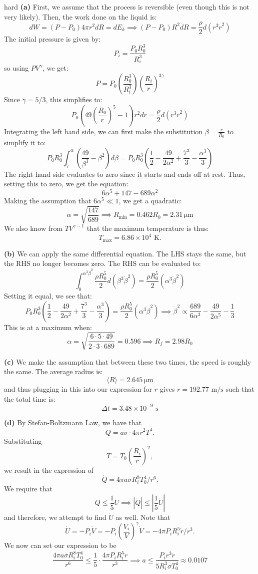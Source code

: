 \begin{solution}{hard}
\textbf{(a)} First, we assume that the process is reversible (even though this is not very likely). Then, the work done on the liquid is:
$$dW=(P-P_0)4\pi r^2 dR = dE_k \implies (P-P_0) R^2 dR = \frac{\rho}{2}d(r^3 \dot{r}^2)$$
The initial pressure is given by:
$$P_i=\frac{P_0R_0^3}{R_i^3}$$
so using $PV^\gamma$, we get:
$$P = P_0 \left(\frac{R_0^3}{R_i^3}\right)\left(\frac{R_i}{r}\right)^{3\gamma}$$
Since $\gamma=5/3$, this simplifies to:
$$P_0\left(49\left(\frac{R_0}{r}\right)^{5}-1\right) r^2 dr = \frac{\rho}{2}d(r^3 \dot{r}^2)$$
Integrating the left hand side, we can first make the substitution $\beta=\frac{r}{R_0}$ to simplify it to:
$$P_0R_0^3 \int_7^\alpha \left(\frac{49}{\beta^3}-\beta^2\right) d\beta = P_0R_0^3 \left(\frac{1}{2}-\frac{49}{2\alpha^2}+\frac{7^3}{3}-\frac{\alpha^3}{3}\right)$$
The right hand side evaluates to zero since it starts and ends off at rest. Thus, setting this to zero, we get the equation:
$$6\alpha^{5}+147-689\alpha^{2}$$
Making the assumption that $6\alpha^5 \ll 1$, we get a quadratic:
$$\alpha=\sqrt{\frac{147}{689}} \implies R_\text{min}=0.462R_0=2.31 \,\mathrm{\mu m}$$
We also know from $TV^{\gamma-1}$ that the maximum temperature is thus:
$$T_\text{max}=6.86 \times 10^4 \text{ K}.$$
\vspace{3mm}

\noindent \textbf{(b)} We can apply the same differential equation. The LHS stays the same, but the RHS no longer becomes zero. The RHS can be evaluated to:
$$\int_{0}^{\alpha^3\dot{\beta}^2} \frac{\rho R_0^5}{2} d(\beta^3\dot{\beta}^2)=\frac{\rho R_0^5}{2}(\alpha^3\dot{\beta}^2)$$
Setting it equal, we see that:
$$P_0R_0^3 \left(\frac{1}{2}-\frac{49}{2\alpha^2}+\frac{7^3}{3}-\frac{\alpha^3}{3}\right)=\frac{\rho R_0^5}{2}(\alpha^3\dot{\beta}^2) \implies \dot{\beta}^2 \propto \frac{689}{6\alpha^3}-\frac{49}{2\alpha^5}-\frac{1}{3}$$
This is at a maximum when:
$$\alpha=\sqrt{\frac{6\cdot5\cdot49}{2\cdot3\cdot689}}=0.596 \implies R_f=2.98 R_0$$
\vspace{3mm}

\noindent \textbf{(c)} We make the assumption that between these two times, the speed is roughly the same. The average radius is:
$$\langle R\rangle = 2.645 \,\mathrm{\mu m}$$
and thus plugging in this into our expression for $\dot{r}$ gives $\dot{r}=192.77 \text{ m/s}$ such that the total time is:
$$\Delta t= 3.48 \times 10^{-9} \text{ s}$$
\vspace{3mm}

\noindent \textbf{(d)} By Stefan-Boltzmann Law, we have that 
\[\dot{Q} = a\sigma \cdot 4\pi r^2 T^4.\]
Substituting 
\[T = T_0 \left(\frac{R_i}{r}\right)^2,\]
we result in the expression of
\[\dot{Q} = 4\pi a \sigma R_i^8 T_0^4/r^6.\]
We require that 
\[Q\leq \frac{1}{5}U\implies \left|\dot{Q}\right| \leq \left|\frac{1}{5}\dot{U}\right|\]
and therefore, we attempt to find $\dot{U}$ as well. Note that 
\[\dot{U} = -P_i \dot{V} = -P_i \left(\frac{V_i}{V}\right)^{\gamma} \dot{V} =  -4\pi P_i R_i^5 \dot{r}/r^3.\]
We now can set our expression to be 
\[\frac{4\pi a\sigma R_i^8 T_0^4}{r^6} \leq \frac{1}{5}\cdot \frac{4\pi P_i R_i^5\dot{r}}{r^3}\implies a \leq \frac{P_i r^3 \dot{r}}{5R_i^3\sigma T_0^4}\approx 0.0107\]
\end{solution}